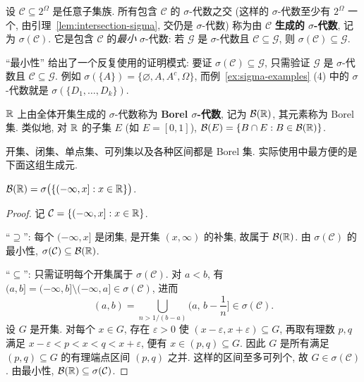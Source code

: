 \begin{definition}\label{def:generated-sigma}
设 $\mathcal{C}\subseteq 2^\Omega$ 是任意子集族. 所有包含 $\mathcal{C}$ 的 $\sigma$-代数之交 (这样的 $\sigma$-代数至少有 $2^\Omega$ 一个, 由引理~\ref{lem:intersection-sigma}, 交仍是 $\sigma$-代数) 称为由 $\mathcal{C}$ \textbf{生成的 $\sigma$-代数}, 记为 $\sigma(\mathcal{C})$. 它是包含 $\mathcal{C}$ 的\emph{最小} $\sigma$-代数: 若 $\mathcal{G}$ 是 $\sigma$-代数且 $\mathcal{C}\subseteq\mathcal{G}$, 则 $\sigma(\mathcal{C})\subseteq\mathcal{G}$.
\end{definition}

``最小性'' 给出了一个反复使用的证明模式: 要证 $\sigma(\mathcal{C})\subseteq\mathcal{G}$, 只需验证 $\mathcal{G}$ 是 $\sigma$-代数且 $\mathcal{C}\subseteq\mathcal{G}$. 例如 $\sigma(\{A\})=\{\varnothing,A,A^c,\Omega\}$, 而例~\ref{ex:sigma-examples} (4) 中的 $\sigma$-代数就是 $\sigma(\{D_1,\dots,D_k\})$.

\begin{definition}\label{def:borel}
$\mathbb{R}$ 上由全体开集生成的 $\sigma$-代数称为 \textbf{Borel $\sigma$-代数}, 记为 $\mathcal{B}(\mathbb{R})$, 其元素称为 Borel 集. 类似地, 对 $\mathbb{R}$ 的子集 $E$ (如 $E=[0,1]$), $\mathcal{B}(E)=\{B\cap E: B\in\mathcal{B}(\mathbb{R})\}$.
\end{definition}

开集、闭集、单点集、可列集以及各种区间都是 Borel 集. 实际使用中最方便的是下面这组生成元.

\begin{proposition}\label{prop:borel-generator}
$\mathcal{B}(\mathbb{R})=\sigma\big(\{(-\infty,x]: x\in\mathbb{R}\}\big)$.
\end{proposition}

\begin{proof}
记 $\mathcal{C}=\{(-\infty,x]: x\in\mathbb{R}\}$.

``$\supseteq$'': 每个 $(-\infty,x]$ 是闭集, 是开集 $(x,\infty)$ 的补集, 故属于 $\mathcal{B}(\mathbb{R})$. 由 $\sigma(\mathcal{C})$ 的最小性, $\sigma(\mathcal{C})\subseteq\mathcal{B}(\mathbb{R})$.

``$\subseteq$'': 只需证明每个开集属于 $\sigma(\mathcal{C})$. 对 $a<b$, 有 $(a,b]=(-\infty,b]\setminus(-\infty,a]\in\sigma(\mathcal{C})$, 进而
\[
(a,b)=\bigcup_{n>1/(b-a)}\Big(a,\,b-\frac{1}{n}\Big]\in\sigma(\mathcal{C}).
\]
设 $G$ 是开集. 对每个 $x\in G$, 存在 $\varepsilon>0$ 使 $(x-\varepsilon,x+\varepsilon)\subseteq G$, 再取有理数 $p,q$ 满足 $x-\varepsilon<p<x<q<x+\varepsilon$, 便有 $x\in(p,q)\subseteq G$. 因此 $G$ 是所有满足 $(p,q)\subseteq G$ 的有理端点区间 $(p,q)$ 之并. 这样的区间至多可列个, 故 $G\in\sigma(\mathcal{C})$. 由最小性, $\mathcal{B}(\mathbb{R})\subseteq\sigma(\mathcal{C})$.
\end{proof}

